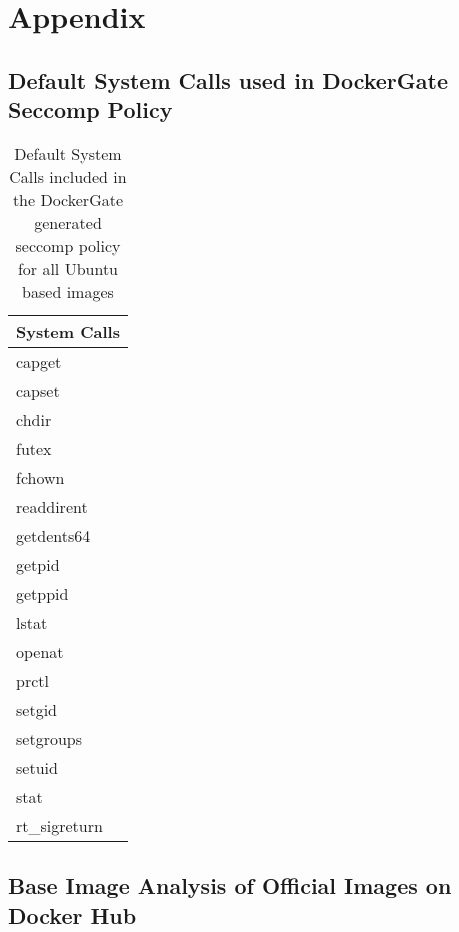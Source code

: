 \section{Appendix}
\label{sec:appendix}
\subsection{Default System Calls used in DockerGate Seccomp Policy}
\begin{table}[h]
\centering
\label{defaultsyscalls}
\begin{tabular}{|p{5cm}|}
\hline
\textbf{System Calls} \\ \hline
capget                \\ \hline
capset                \\ \hline
chdir                 \\ \hline
futex                 \\ \hline
fchown                \\ \hline
readdirent            \\ \hline
getdents64            \\ \hline
getpid                \\ \hline
getppid               \\ \hline
lstat                 \\ \hline
openat                \\ \hline
prctl                 \\ \hline
setgid                \\ \hline
setgroups             \\ \hline
setuid                \\ \hline
stat                  \\ \hline
rt\_sigreturn         \\ \hline
\end{tabular}
\caption{Default System Calls included in  the DockerGate generated seccomp policy for all Ubuntu based images}
\end{table}


\newpage
\subsection{Base Image Analysis of Official Images on Docker Hub}


